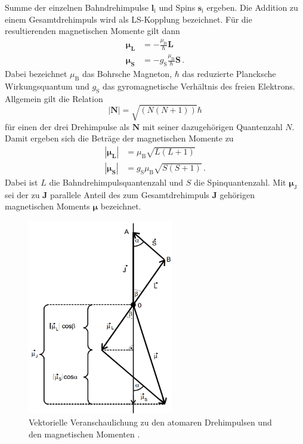 Summe der einzelnen Bahndrehimpulse $\symbf{l}_{\text{i}}$ und Spins $\symbf{s}_{\text{i}}$ ergeben.
Die Addition zu einem Gesamtdrehimpuls wird als LS-Kopplung bezeichnet. Für die
resultierenden magnetischen Momente gilt dann
\begin{align}
  \symbf{\mu_{\text{L}}} &= - \frac{\mu_{\text{B}}}{\hbar} \symbf{L} \,\\
  \symbf{\mu_{\text{S}}} &= - g_{\text{S}} \frac{\mu_{\text{B}}}{\hbar} \symbf{S} \,.
  \label{eqn:mulmus}
\end{align}
Dabei bezeichnet $\mu_{\text{B}}$ das Bohrsche Magneton, $\hbar$ das reduzierte Plancksche
Wirkungsquantum und $g_{\text{S}}$ das gyromagnetische Verhältnis des freien Elektrons.
Allgemein gilt die Relation
\begin{equation}
  |\symbf{N}| = \sqrt{(N(N+1))} \hbar
\end{equation}
für einen der drei Drehimpulse als $\symbf{N}$ mit seiner dazugehörigen Quantenzahl
$N$. Damit ergeben sich die Beträge der magnetischen Momente zu
\begin{align}
  |\symbf{\mu_{\text{L}}}| &= \mu_{\text{B}} \sqrt{L(L+1)} \, \\
  |\symbf{\mu_{\text{S}}}| &= g_{\text{S}} \mu_{\text{B}} \sqrt{S(S+1)} \, .
\end{align}
Dabei ist $L$ die Bahndrehimpulsquantenzahl und $S$ die Spinquantenzahl.
Mit $\symbf{\mu}_{\text{J}}$ sei der zu $\symbf{J}$ parallele Anteil des zum Gesamtdrehimpuls $\symbf{J}$
gehörigen magnetischen Moments $\symbf{\mu}$ bezeichnet.

\begin{figure}
  \centering
  \includegraphics[width=180pt]{data/drehimpulse.png}
  \caption{Vektorielle Veranschaulichung zu den atomaren Drehimpulsen und den magnetischen Momenten \cite{Versuchsanleitung}.}
  \label{fig:vektordreh}
\end{figure}


